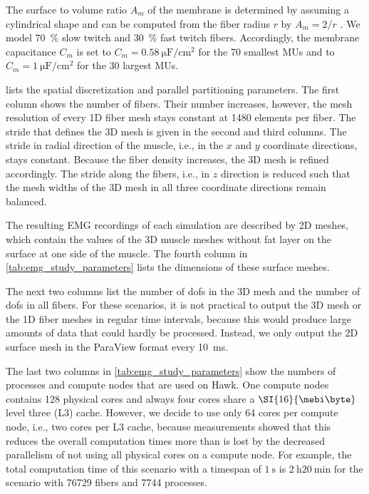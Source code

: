 The surface to volume ratio $A_m$ of the membrane is determined by assuming a cylindrical shape and can be computed from the fiber radius $r$ by $A_m = 2/r$ \cite{Klotz2020}. We model \SI{70}{\percent} slow twitch and \SI{30}{\percent} fast twitch fibers. Accordingly, the membrane capacitance $C_m$ is set to $C_m = \SI{0.58}{\micro\farad\per\centi\meter\squared}$ for the 70 smallest MUs and to $C_m = \SI{1}{\micro\farad\per\centi\meter\squared}$ for the 30 largest MUs.

 lists the spatial discretization and parallel partitioning parameters. The first column shows the number of fibers. Their number increases, however, the mesh resolution of every 1D fiber mesh stays constant at 1480 elements per fiber. The stride that defines the 3D mesh is given in the second and third columns. The stride in radial direction of the muscle, i.e., in the $x$ and $y$ coordinate directions, stays constant. Because the fiber density increases, the 3D mesh is refined accordingly. The stride along the fibers, i.e., in $z$ direction is reduced such that the mesh widths of the 3D mesh in all three coordinate directions remain balanced.

The resulting EMG recordings of each simulation are described by 2D meshes, which contain the values of the 3D muscle meshes without fat layer on the surface at one side of the muscle.  The fourth column in \cref{tab:emg_study_parameters} lists the dimensions of these surface meshes. 

The next two columns list the number of dofs in the 3D mesh and the number of dofs in all fibers. For these scenarios, it is not practical to output the 3D mesh or the 1D fiber meshes in regular time intervals, because this would produce large amounts of data that could hardly be processed. Instead, we only output the 2D surface mesh in the ParaView format every \SI{10}{\milli\second}.

The last two columns in \cref{tab:emg_study_parameters} show the numbers of processes and compute nodes that are used on Hawk. One compute nodes contains 128 physical cores and always four cores share a $\SI{16}{\mebi\byte}$ level three (L3) cache. However, we decide to use only 64 cores per compute node, i.e., two cores per L3 cache, because measurements showed that this reduces the overall computation times more than is lost by the decreased parallelism of not using all physical cores on a compute node. For example, the total computation time of this scenario with a timespan of $\SI{1}{\s}$ is $\SI{2}{\hour} \SI{20}{\minute}$ for the scenario with \num{76729} fibers and 7744 processes.

